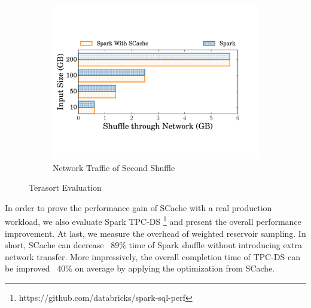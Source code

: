 \begin{figure}
\begin{minipage}[t]{.32\linewidth}
\begin{subfigure}{\linewidth}
			\begin{minipage}{\linewidth}
				\includegraphics[width=\linewidth]{fig/tera_shuffle}
				\caption{Network Traffic of Second Shuffle}
				\label{fig:terashuffle}
			\end{minipage}
		\end{subfigure}
		\caption{Terasort Evaluation}
	\end{minipage}
	\vspace{-1em}
\end{figure}
In order to prove the performance gain of SCache with a real production workload, we also evaluate Spark TPC-DS \footnote{https://github.com/databricks/spark-sql-perf} and present the overall performance improvement.
At last, we measure the overhead of weighted reservoir sampling. 
In short, SCache can decrease ~$89\%$ time of Spark shuffle without introducing extra network transfer. 
More impressively, the overall completion time of TPC-DS can be improved ~$40\%$ on average by applying the optimization from SCache.

